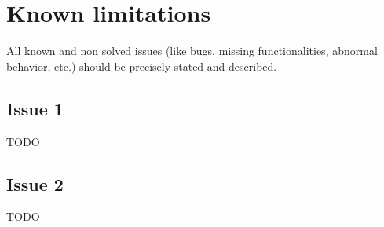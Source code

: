 \chapter{Known limitations}
\label{chap:know_limitations}


All known and non solved issues (like bugs, missing functionalities, abnormal
behavior, etc.) should be precisely stated and described.


\section{Issue 1}
TODO

\section{Issue 2}
TODO
